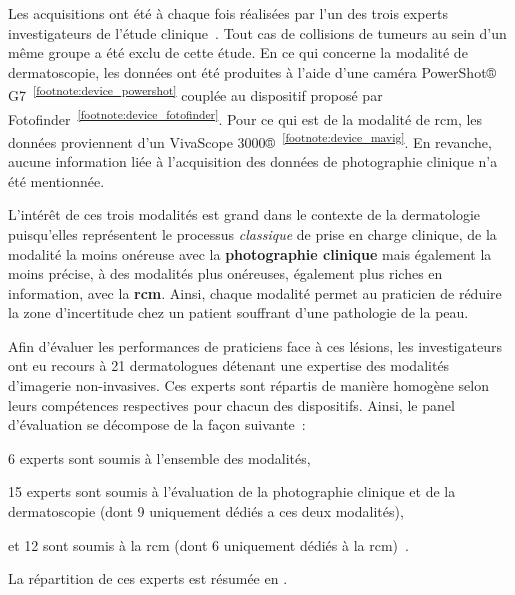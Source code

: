 Les acquisitions ont été à chaque fois réalisées par l'un des trois experts investigateurs de l'étude clinique~\cite{Cinotti2018}. Tout cas de collisions de tumeurs au sein d'un même groupe a été exclu de cette étude. En ce qui concerne la modalité de dermatoscopie, les données ont été produites à l'aide d'une caméra PowerShot® G7~\textsuperscript{\ref{footnote:device_powershot}} couplée au dispositif proposé par Fotofinder~\textsuperscript{\ref{footnote:device_fotofinder}}. Pour ce qui est de la modalité de \gls{rcm}, les données proviennent d'un VivaScope 3000®~\textsuperscript{\ref{footnote:device_mavig}}. En revanche, aucune information liée à l'acquisition des données de photographie clinique n'a été mentionnée.\par

L'intérêt de ces trois modalités est grand dans le contexte de la dermatologie puisqu'elles représentent le processus \textit{classique} de prise en charge clinique, de la modalité la moins onéreuse avec la \textbf{photographie clinique} mais également la moins précise, à des modalités plus onéreuses, également plus riches en information, avec la \textbf{\gls{rcm}}. Ainsi, chaque modalité permet au praticien de réduire la zone d'incertitude chez un patient souffrant d'une pathologie de la peau.

\addtocounter{footnote}{1}
\addtocounter{footnote}{1}
\addtocounter{footnote}{1}

Afin d'évaluer les performances de praticiens face à ces lésions, les investigateurs ont eu recours à 21 dermatologues détenant une expertise des modalités d'imagerie non-invasives. Ces experts sont répartis de manière homogène selon leurs compétences respectives pour chacun des dispositifs. Ainsi, le panel d'évaluation se décompose de la façon suivante~:~
\begin{inlinerate}
    \item 6 experts sont soumis à l'ensemble des modalités,
    \item 15 experts sont soumis à l'évaluation de la photographie clinique et de la dermatoscopie (dont 9 uniquement dédiés a ces deux modalités),
    \item et 12 sont soumis à la \gls{rcm} (dont 6 uniquement dédiés à la \gls{rcm})~\cite{Cinotti2018}.
\end{inlinerate}
La répartition de ces experts est résumée en .\par

